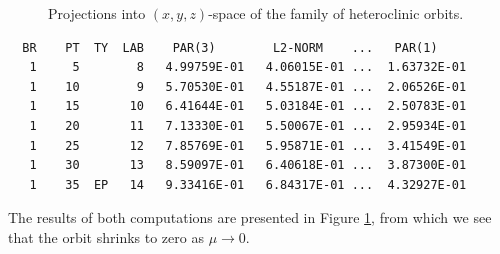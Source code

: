 \documentclass[12pt]{report}
\begin{document}
%
\begin{figure}[b]
\epsfysize 9.0cm
\centerline{}
\caption{Projections into $(x,y,z)$-space of the family of heteroclinic
orbits.}
\label{Fshear}
\end{figure}
%
\begin{verbatim}
  BR    PT  TY  LAB    PAR(3)        L2-NORM    ...   PAR(1)     
   1     5        8   4.99759E-01   4.06015E-01 ...  1.63732E-01
   1    10        9   5.70530E-01   4.55187E-01 ...  2.06526E-01
   1    15       10   6.41644E-01   5.03184E-01 ...  2.50783E-01
   1    20       11   7.13330E-01   5.50067E-01 ...  2.95934E-01
   1    25       12   7.85769E-01   5.95871E-01 ...  3.41549E-01
   1    30       13   8.59097E-01   6.40618E-01 ...  3.87300E-01
   1    35  EP   14   9.33416E-01   6.84317E-01 ...  4.32927E-01
\end{verbatim}
The results of both computations are presented in Figure \ref{Fshear}, 
from which we see that the orbit shrinks to zero as
$\mu \to 0$.
\end{document}
